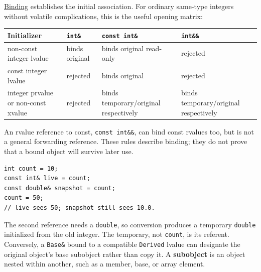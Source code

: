 \hyperref[appendix-37856d997bb0]{Binding} establishes the initial association. For ordinary same-type integers without volatile complications, this is the useful opening matrix:

{\def\LTcaptype{none} %
\begin{longtable}[]{@{}
  >{\raggedright\arraybackslash}p{}
  >{\raggedright\arraybackslash}p{}
  >{\raggedright\arraybackslash}p{}
  >{\raggedright\arraybackslash}p{}@{}}
\toprule\noalign{}
\begin{minipage}[b]{\linewidth}\raggedright
Initializer
\end{minipage} & \begin{minipage}[b]{\linewidth}\raggedright
\texttt{int\&}
\end{minipage} & \begin{minipage}[b]{\linewidth}\raggedright
\texttt{const\ int\&}
\end{minipage} & \begin{minipage}[b]{\linewidth}\raggedright
\texttt{int\&\&}
\end{minipage} \\
\midrule\noalign{}
\endhead
\bottomrule\noalign{}
\endlastfoot
non-const integer lvalue & binds original & binds original read-only & rejected \\
const integer lvalue & rejected & binds original & rejected \\
integer prvalue or non-const xvalue & rejected & binds temporary/original respectively & binds temporary/original respectively \\
\end{longtable}
}

An rvalue reference to const, \texttt{const\ int\&\&}, can bind const rvalues too, but is not a general forwarding reference. These rules describe binding; they do not prove that a bound object will survive later use.

\begin{verbatim}
int count = 10;
const int& live = count;
const double& snapshot = count;
count = 50;
// live sees 50; snapshot still sees 10.0.
\end{verbatim}

The second reference needs a \texttt{double}, so conversion produces a temporary \texttt{double} initialized from the old integer. The temporary, not \texttt{count}, is its referent. Conversely, a \texttt{Base\&} bound to a compatible \texttt{Derived} lvalue can designate the original object's base subobject rather than copy it. A \textbf{subobject} is an object nested within another, such as a member, base, or array element.

